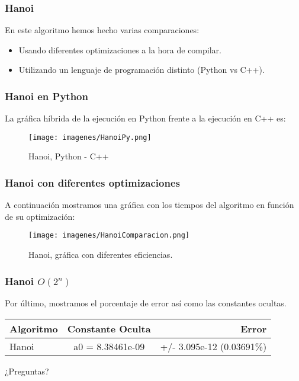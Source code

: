 \documentclass{beamer}
\begin{document}
\begin{frame}
	\frametitle{Hanoi}
	En este algoritmo hemos hecho varias comparaciones:
	\begin{itemize}
		\item Usando diferentes optimizaciones a la hora de compilar.
		\item Utilizando un lenguaje de programación distinto (Python vs C++).
	\end{itemize}
\end{frame}

\begin{frame}
	\frametitle{Hanoi en Python}
	La gráfica híbrida de la ejecución en Python frente a la ejecución en C++ es:
	\begin{figure}
		\centering
		\texttt{[image: imagenes/HanoiPy.png]}
		\caption{Hanoi, Python - C++}
		\label{fig:E21}
	\end{figure}
\end{frame}

\begin{frame}
	\frametitle{Hanoi con diferentes optimizaciones}
	A continuación mostramos una gráfica con los tiempos del algoritmo en función de su optimización:
	\begin{figure}
		\centering
		\texttt{[image: imagenes/HanoiComparacion.png]}
		\caption{Hanoi, gráfica con diferentes eficiencias.}
		\label{fig:E22}
	\end{figure}
\end{frame}

\begin{frame}
	\frametitle{Hanoi $O(2^n)$}
	Por último, mostramos el porcentaje de error así como las constantes ocultas.\\
	
	\begin{center}
		\begin{tabular}{| l | c | r |}
			\hline
			\textbf{Algoritmo} & \textbf{Constante Oculta} & \textbf{Error} \\ \hline
			Hanoi & a0 = 8.38461e-09 & +/- 3.095e-12    (0.03691\%)\\ \hline
		\end{tabular}
	\end{center}

\end{frame}



\begin{frame}
\Huge{\centerline{¿Preguntas?}}
\end{frame}

\end{document}
